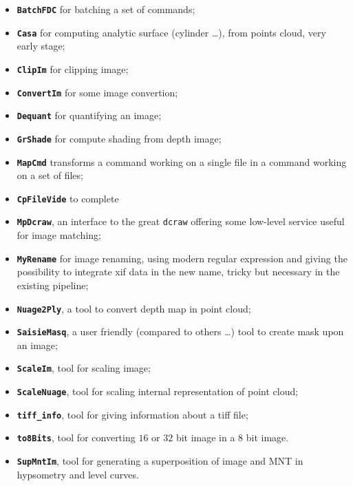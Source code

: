 \begin{itemize}
   \item {\tt \bf BatchFDC} for batching a set of commands;

   \item {\tt \bf Casa} for computing analytic surface (cylinder \dots),
                        from points cloud, very early stage;

   \item {\tt \bf ClipIm} for clipping image;

   \item {\tt \bf ConvertIm} for some image convertion;

   \item {\tt \bf Dequant} for quantifying an image;

   \item {\tt \bf GrShade} for compute shading from depth image;

   \item {\tt \bf MapCmd} transforms a command working on a single file in a command
         working on a set of files;

   \item {\tt \bf CpFileVide}   to complete

   \item {\tt \bf MpDcraw}, an interface to the great {\tt dcraw} offering some low-level
         service useful for image matching;

   \item {\tt \bf MyRename} for image renaming, using modern regular expression and giving the possibility
         to integrate xif data in the new name, tricky but necessary in the existing pipeline;

    \item {\tt \bf Nuage2Ply}, a tool to convert depth map in point cloud;

   \item {\tt \bf SaisieMasq}, a user friendly (compared to others \dots) tool to create
         mask upon an image;

   \item {\tt \bf ScaleIm}, tool for scaling image;

   \item {\tt \bf ScaleNuage}, tool for scaling internal representation of point cloud;

   \item {\tt \bf tiff\_info}, tool for giving information about a tiff file;

   \item {\tt \bf to8Bits}, tool for converting $16$ or $32$ bit image in a $8$ bit image.

   \item {\tt \bf SupMntIm}, tool for generating a superposition of image and MNT in hypsometry 
         and level curves.

\end{itemize}









